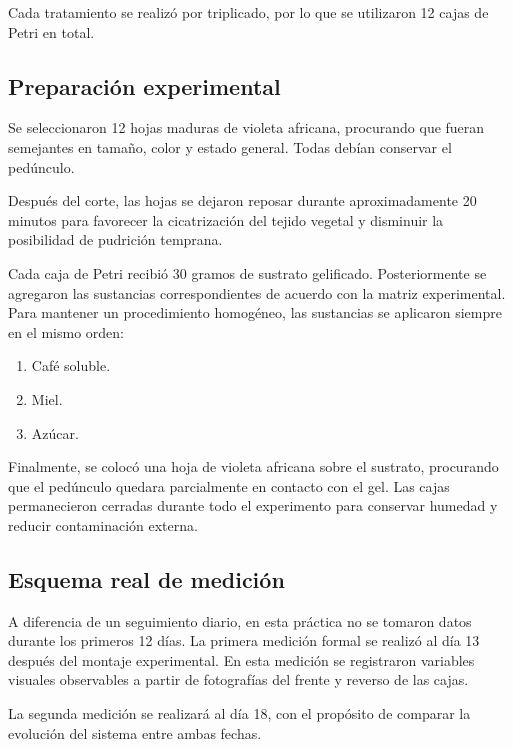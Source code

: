 Cada tratamiento se realizó por triplicado, por lo que se utilizaron 12 cajas de Petri en total.

\subsection{Preparación experimental}

Se seleccionaron 12 hojas maduras de violeta africana, procurando que fueran semejantes en tamaño, color y estado general. Todas debían conservar el pedúnculo.

Después del corte, las hojas se dejaron reposar durante aproximadamente 20 minutos para favorecer la cicatrización del tejido vegetal y disminuir la posibilidad de pudrición temprana.

Cada caja de Petri recibió 30 gramos de sustrato gelificado. Posteriormente se agregaron las sustancias correspondientes de acuerdo con la matriz experimental. Para mantener un procedimiento homogéneo, las sustancias se aplicaron siempre en el mismo orden:

\begin{enumerate}
\item Café soluble.
\item Miel.
\item Azúcar.
\end{enumerate}

Finalmente, se colocó una hoja de violeta africana sobre el sustrato, procurando que el pedúnculo quedara parcialmente en contacto con el gel. Las cajas permanecieron cerradas durante todo el experimento para conservar humedad y reducir contaminación externa.

\subsection{Esquema real de medición}

A diferencia de un seguimiento diario, en esta práctica no se tomaron datos durante los primeros 12 días. La primera medición formal se realizó al día 13 después del montaje experimental. En esta medición se registraron variables visuales observables a partir de fotografías del frente y reverso de las cajas.

La segunda medición se realizará al día 18, con el propósito de comparar la evolución del sistema entre ambas fechas.

\begin{table}[H]
\centering
{}
\caption{Esquema real de medición del experimento.}
\end{table}

